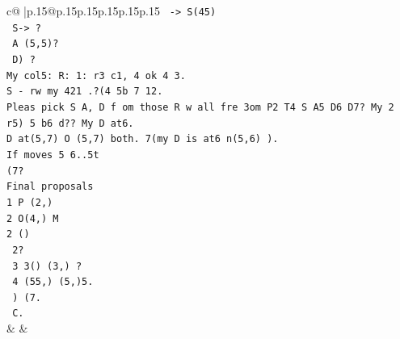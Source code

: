 \documentclass{article}
\begin{document}
{\begin{supertabular}{c@{$\;$}|p{.15\linewidth}@{}p{.15\linewidth}p{.15\linewidth}p{.15\linewidth}p{.15\linewidth}p{.15\linewidth}}
{{{\texttt{ {-}> S(45)} \\
\texttt{ S{-}> ?} \\
\texttt{ A (5,5)?} \\
\texttt{ D) ?} \\
\texttt{My col5: R: 1: r3 c1, 4 ok 4 3. } \\
\texttt{S {-} rw my 421 .?(4 5b 7 12.} \\
\texttt{Pleas pick S A, D f om those R w all fre 3om P2 T4 S A5 D6 D7? My 2 r5) 5 b6 d?? My D at6.} \\
\texttt{D at(5,7) O (5,7) both. 7(my D is at6 n(5,6) ).} \\
\texttt{If moves 5 6..5t} \\
\texttt{(7?} \\
\texttt{Final proposals} \\
\texttt{1 P (2,)} \\
\texttt{2 O(4,) M} \\
\texttt{2 ()} \\
\texttt{ 2?} \\
\texttt{ 3 3() (3,)  ?} \\
\texttt{ 4 (55,)    (5,)5.} \\
\texttt{   ) (7.} \\
\texttt{ C.} \\
            }
        }
    }
    & & \\ \\


\end{supertabular}}
\end{document}
